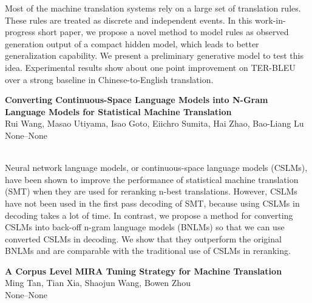 \documentclass[twoside,makeidx]{book}
\renewcommand{\normalsize}{\fontsize{8}{9}\selectfont}
\renewcommand{\small}{\fontsize{7}{8}\selectfont}
\begin{document}
\nopagebreak%
\noindent%
{\small Most of the machine translation systems rely on a large set of translation rules. These rules are treated as discrete and independent events. In this work-in-progress short paper, we propose a novel method to model rules as observed generation output of a compact hidden model, which leads to better generalization capability. We present a preliminary generative model to test this idea. Experimental results show about one point improvement on TER-BLEU over a strong baseline in Chinese-to-English translation.}
\par\vspace{2em}\noindent%
\begin{minipage}{\linewidth}%
\begin{center}
\textbf{\normalsize Converting Continuous-Space Language Models into N-Gram Language Models for Statistical Machine Translation}\\
\normalsize  Rui Wang,  Masao Utiyama,  Isao Goto,  Eiichro Sumita,  Hai Zhao,  Bao-Liang Lu\\
{\small None--None}\\
\end{center}
\end{minipage}\\[0.5em]
\nopagebreak%
\noindent%
{\small Neural network language models, or continuous-space language models (CSLMs), have been shown to improve the performance of statistical machine translation (SMT) when they are used for reranking n-best translations. However, CSLMs have not been used in the first pass decoding of SMT, because using CSLMs in decoding takes a lot of time. In contrast, we propose a method for converting CSLMs into back-off n-gram language models (BNLMs) so that we can use converted CSLMs in decoding. We show that they outperform the original BNLMs and are comparable with the traditional use of CSLMs in reranking.}
\par\vspace{2em}\noindent%
\begin{minipage}{\linewidth}%
\begin{center}
\textbf{\normalsize A Corpus Level MIRA Tuning Strategy for Machine Translation}\\
\normalsize  Ming Tan,  Tian Xia,  Shaojun Wang,  Bowen Zhou\\
{\small None--None}\\
\end{center}
\end{minipage}\\[0.5em]
\end{document}
